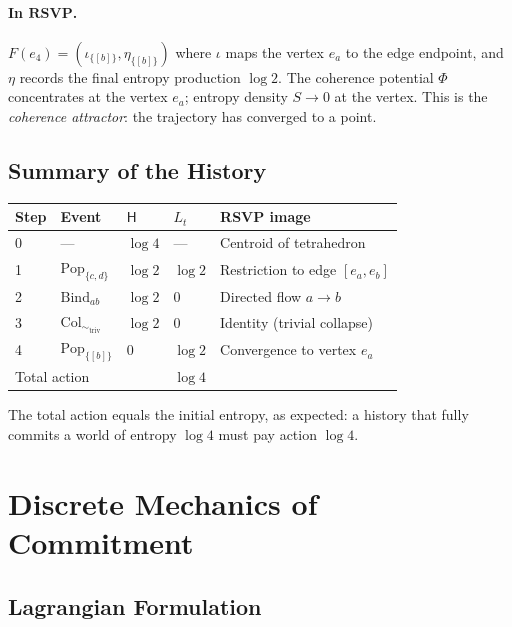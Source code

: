 \documentclass[12pt,a4paper]{article}
\theoremstyle{definition}
\theoremstyle{remark}
\newcommand{\Ent}{\mathsf{H}}
\newcommand{\RSVP}{\mathbf{RSVP}}
\newcommand{\Pop}{\mathrm{Pop}}
\newcommand{\Bind}{\mathrm{Bind}}
\newcommand{\Col}{\mathrm{Col}}
\newcommand{\PhiF}{\Phi}
\newcommand{\SF}{S}
\begin{document}
\paragraph{In $\RSVP$.}
$F(e_4)=(\iota_{\{[b]\}},\eta_{\{[b]\}})$ where $\iota$ maps the vertex $e_a$ to
the edge endpoint, and $\eta$ records the final entropy production $\log 2$. The
coherence potential $\PhiF$ concentrates at the vertex $e_a$; entropy density
$\SF\to 0$ at the vertex. This is the \emph{coherence attractor}: the trajectory has
converged to a point.

\subsection{Summary of the History}

\begin{center}
\renewcommand{\arraystretch}{1.5}
\begin{tabular}{lllll}
\toprule
\textbf{Step} & \textbf{Event} & $\Ent$ & $L_t$ & \textbf{RSVP image} \\
\midrule
0 & — & $\log 4$ & — & Centroid of tetrahedron \\
1 & $\Pop_{\{c,d\}}$ & $\log 2$ & $\log 2$ & Restriction to edge $[e_a,e_b]$ \\
2 & $\Bind_{ab}$ & $\log 2$ & $0$ & Directed flow $a\to b$ \\
3 & $\Col_{\sim_{\mathrm{triv}}}$ & $\log 2$ & $0$ & Identity (trivial collapse) \\
4 & $\Pop_{\{[b]\}}$ & $0$ & $\log 2$ & Convergence to vertex $e_a$ \\
\midrule
\multicolumn{3}{l}{Total action} & $\log 4$ & \\
\bottomrule
\end{tabular}
\end{center}

The total action equals the initial entropy, as expected: a history that fully commits
a world of entropy $\log 4$ must pay action $\log 4$.

\section{Discrete Mechanics of Commitment}
\label{sec:mechanics}

\subsection{Lagrangian Formulation}
\end{document}
